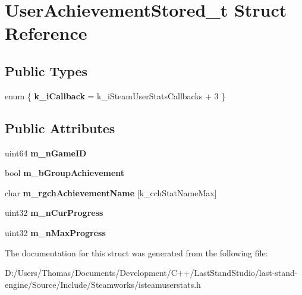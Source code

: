 \hypertarget{structUserAchievementStored__t}{}\section{User\+Achievement\+Stored\+\_\+t Struct Reference}
\label{structUserAchievementStored__t}
\subsection*{Public Types}
\begin{DoxyCompactItemize}
\item 
\hypertarget{structUserAchievementStored__t_a944bb95052a2789ed97044f8746370c8}{}enum \{ {\bfseries k\+\_\+i\+Callback} = k\+\_\+i\+Steam\+User\+Stats\+Callbacks + 3
 \}\label{structUserAchievementStored__t_a944bb95052a2789ed97044f8746370c8}

\end{DoxyCompactItemize}
\subsection*{Public Attributes}
\begin{DoxyCompactItemize}
\item 
\hypertarget{structUserAchievementStored__t_a5ab451c730543139cd247f312a6fbc1f}{}uint64 {\bfseries m\+\_\+n\+Game\+I\+D}\label{structUserAchievementStored__t_a5ab451c730543139cd247f312a6fbc1f}

\item 
\hypertarget{structUserAchievementStored__t_a6f827a81ebfa66b0ca09496c96edbeeb}{}bool {\bfseries m\+\_\+b\+Group\+Achievement}\label{structUserAchievementStored__t_a6f827a81ebfa66b0ca09496c96edbeeb}

\item 
\hypertarget{structUserAchievementStored__t_acaa3e757c67143c8d7c4b99bc39c07ed}{}char {\bfseries m\+\_\+rgch\+Achievement\+Name} \mbox{[}k\+\_\+cch\+Stat\+Name\+Max\mbox{]}\label{structUserAchievementStored__t_acaa3e757c67143c8d7c4b99bc39c07ed}

\item 
\hypertarget{structUserAchievementStored__t_a87b87f60deb9d9882bd3f31238a5cb74}{}uint32 {\bfseries m\+\_\+n\+Cur\+Progress}\label{structUserAchievementStored__t_a87b87f60deb9d9882bd3f31238a5cb74}

\item 
\hypertarget{structUserAchievementStored__t_a49c36b1b6c8bad694e8fd4248a93a75c}{}uint32 {\bfseries m\+\_\+n\+Max\+Progress}\label{structUserAchievementStored__t_a49c36b1b6c8bad694e8fd4248a93a75c}

\end{DoxyCompactItemize}


The documentation for this struct was generated from the following file\+:\begin{DoxyCompactItemize}
\item 
D\+:/\+Users/\+Thomas/\+Documents/\+Development/\+C++/\+Last\+Stand\+Studio/last-\/stand-\/engine/\+Source/\+Include/\+Steamworks/isteamuserstats.\+h\end{DoxyCompactItemize}
